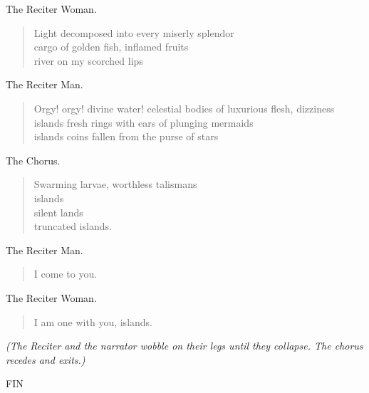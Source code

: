 \documentclass[letterpaper,article,12pt,oneside,notitlepage]{memoir}
\begin{document}
\begin{center}The Reciter Woman.\end{center}

\begin{verse}
Light decomposed into every miserly splendor \\
cargo of golden fish, inflamed fruits \\
river on my scorched lips \\
\end{verse}

\begin{center}The Reciter Man.\end{center}

\begin{verse}
Orgy! orgy! divine water! celestial bodies of luxurious flesh, dizziness \\
islands fresh rings with ears of plunging mermaids \\
islands coins fallen from the purse of stars \\
\end{verse}

\clearpage

\begin{center}The Chorus.\end{center}

\begin{verse}
Swarming larvae, worthless talismans \\
islands \\
silent lands \\
truncated islands. \\
\end{verse}

\begin{center}The Reciter Man.\end{center}

\begin{verse}
I come to you. \\
\end{verse}

\begin{center}The Reciter Woman.\end{center}

\begin{verse}
I am one with you, islands. \\
\end{verse}

\textit{(The Reciter and the narrator wobble on their legs until they collapse. The chorus recedes and exits.)}

\vspace{1cm}

\begin{center}FIN\end{center}
\end{document}
